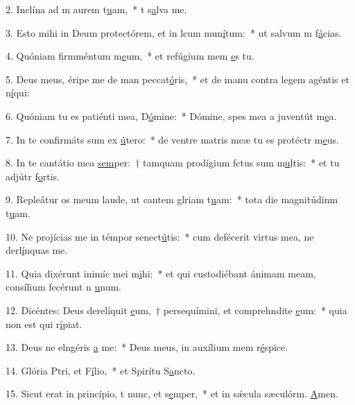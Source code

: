 2. Inclína ad m aurem t\uline{u}am,~* t s\uline{a}lva me.\par 
3. Esto mihi in Deum protectórem, et in lcum mun\uline{í}tum:~* ut salvum m f\uline{á}cias.\par 
4. Quóniam firmméntum m\uline{e}um,~* et refúgium mem \uline{e}s tu.\par 
5. Deus meus, éripe me de man peccat\uline{ó}ris,~* et de manu contra legem agéntis et n\uline{í}qui:\par 
6. Quóniam tu es patiénti mea, D\uline{ó}mine:~* Dómine, spes mea a juventút m\uline{e}a.\par 
7. In te confirmáts sum ex \uline{ú}tero:~* de ventre matris meæ tu es protéctr m\uline{e}us.\par 
8. In te cantátio mea \uline{sem}per:~† tamquam prodígium fctus sum m\uline{u}ltis:~* et tu adjútr f\uline{o}rtis.\par 
9. Repleátur os meum laude, ut cantem glriam t\uline{u}am:~* tota die magnitúdinm t\uline{u}am.\par 
10. Ne projícias me in témpor senect\uline{ú}tis:~* cum defécerit virtus mea, ne derl\uline{í}nquas me.\par 
11. Quia dixérunt inimíc mei m\uline{i}hi:~* et qui custodiébant ánimam meam, consílium fecérunt n \uline{u}num.\par 
12. Dicéntes: Deus derelíquit \uline{e}um,~† persequímini, et comprehndite \uline{e}um:~* quia non est qui r\uline{í}piat.\par 
13. Deus ne elngéris \uline{a} me:~* Deus meus, in auxílium mem r\uline{é}spice.\par 
14. Glória Ptri, et F\uline{í}lio,~* et Spirítu S\uline{a}ncto.\par 
15. Sicut erat in princípio, t nunc, et s\uline{e}mper,~* et in sǽcula sæculórm. \uline{A}men.\par 
